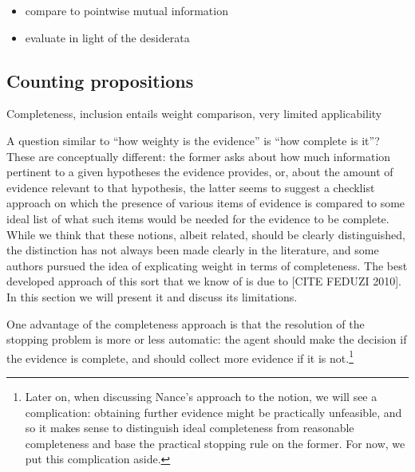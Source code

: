 \documentclass[
  10pt,
  dvipsnames,enabledeprecatedfontcommands]{scrartcl}
\begin{document}
\begin{itemize}
\item
  compare to pointwise mutual information
\item
  evaluate in light of the desiderata
\end{itemize}

\hypertarget{counting-propositions}{%
\subsection{Counting propositions}\label{counting-propositions}}

Completeness, inclusion entails weight comparison, very limited
applicability

A question similar to ``how weighty is the evidence'' is ``how complete
is it''? These are conceptually different: the former asks about how
much information pertinent to a given hypotheses the evidence provides,
or, about the amount of evidence relevant to that hypothesis, the latter
seems to suggest a checklist approach on which the presence of various
items of evidence is compared to some ideal list of what such items
would be needed for the evidence to be complete. While we think that
these notions, albeit related, should be clearly distinguished, the
distinction has not always been made clearly in the literature, and some
authors pursued the idea of explicating weight in terms of completeness.
The best developed approach of this sort that we know of is due to
{[}CITE FEDUZI 2010{]}. In this section we will present it and discuss
its limitations.

One advantage of the completeness approach is that the resolution of the
stopping problem is more or less automatic: the agent should make the
decision if the evidence is complete, and should collect more evidence
if it is not.\footnote{Later on, when discussing Nance's approach to the
  notion, we will see a complication: obtaining further evidence might
  be practically unfeasible, and so it makes sense to distinguish ideal
  completeness from reasonable completeness and base the practical
  stopping rule on the former. For now, we put this complication aside.}
\end{document}
